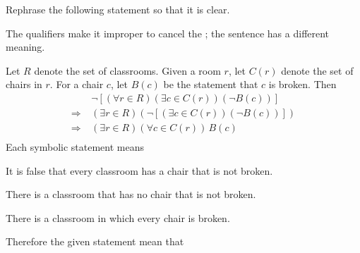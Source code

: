 \begin{eg}
Rephrase the following statement so that it is clear.

\centerline{}
\end{eg}
\begin{sol}
The qualifiers make it improper to cancel the ;
the sentence  has a different meaning.

Let $R$ denote the set of classrooms.
Given a room $r$, let $C(r)$ denote the set of chairs in $r$.
For a chair $c$, let $B(c)$ be the statement that $c$ is broken.
Then
\begin{align*}
& \neg\left[(\forall r\in R)(\exists c\in C(r))(\neg B(c))\right]\tag{1}\\
\Longrightarrow \ & (\exists r \in R)\left(\neg\left[(\exists c\in C(r))(\neg B(c))\right]\right)\tag{2}\\
\Longrightarrow \ & (\exists r \in R)(\forall c\in C(r))\, B(c)\tag{3}\\
\end{align*}
Each symbolic statement means
\begin{myEnum}
\item It is false that every classroom has a chair that is not broken.
\item There is a classroom that has no chair that is not broken.
\item There is a classroom in which every chair is broken.
\end{myEnum}
Therefore the given statement mean that

\centerline{}
\end{sol}


